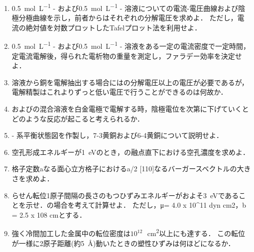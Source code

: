 \documentclass[uplatex,dvipdfmx,a4paper,10pt]{jsarticle}
\def\tightlist{\itemsep1pt\parskip0pt\parsep0pt}
\begin{document}
\begin{enumerate}
\def\labelenumi{\arabic{enumi}.}
\tightlist
\item
  \SI[per-mode=symbol]{0.5}{\mole \per \liter} -
  および\SI[per-mode=symbol]{0.5}{\mole \per \liter} -
  溶液についての電流-電圧曲線および陰極分極曲線を示し，前者からはそれぞれの分解電圧を求めよ．
  ただし，電流の絶対値を対数プロットしたTafelプロット法を利用せよ．
\item
  \SI[per-mode=symbol]{0.5}{\mole \per \liter} -
  および\SI[per-mode=symbol]{0.5}{\mole \per \liter} -
  溶液をある一定の電流密度で一定時間，定電流電解後，得られた電析物の重量を測定し，ファラデー効率を決定せよ．
\item
  溶液から銅を電解抽出する場合にはの分解電圧以上の電圧が必要であるが，電解精製はこれよりずっと低い電圧で行うことができるのは何故か．
\item
  およびの混合溶液を白金電極で電解する時，陰極電位を次第に下げていくとどのような反応が起こると考えられるか．
\item
   -
  系平衡状態図を作製し，7-3黄銅および6-4黄銅について説明せよ．
\item
  空孔形成エネルギーが\SI{1}{\electronvolt}のとき，の融点直下における空孔濃度を求めよ．
\item
  格子定数aなる面心立方格子におけるa/2
  {[}110{]}なるバーガースベクトルの大きさを求めよ．
\item
  らせん転位1原子間隔の長さのもつひずみエネルギーがおよそ\SI{3}{\electronvolt}であることを示せ．の場合を考えて計算せよ．
  ただし，μ= 4.0 x 10\^{}11 dyn cm2，b = 2.5 x 108 cmとする．
\item
  強く冷間加工した金属中の転位密度は\({10^{12}}\)\,\si{\per \square \centi\metre}以上にも達する．
  この転位が一様に2原子距離(約\SI{5}{\angstrom})動いたときの塑性ひずみは何ほどになるか．
\end{enumerate}

\printbibliography[title=参考文献]
\end{document}
